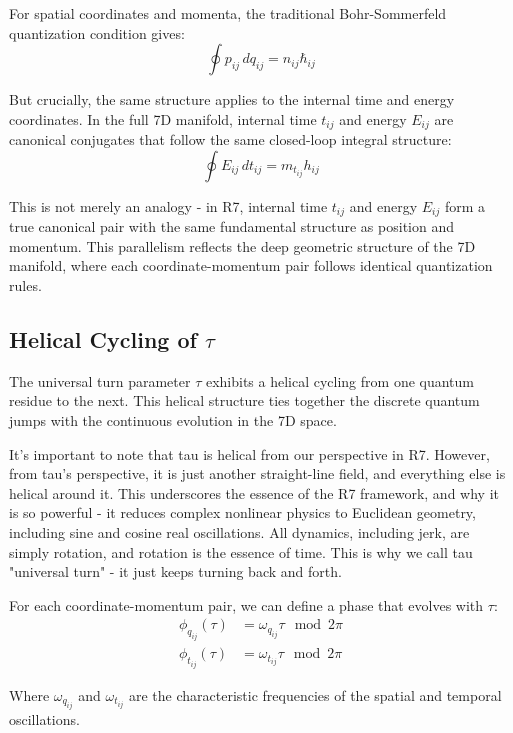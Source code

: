 \documentclass{article}
\begin{document}
For spatial coordinates and momenta, the traditional Bohr-Sommerfeld quantization condition gives:
\begin{equation}
\oint p_{ij} \, dq_{ij} = n_{ij} \hbar_{ij}
\end{equation}

But crucially, the same structure applies to the internal time and energy coordinates. In the full 7D manifold, internal time $t_{ij}$ and energy $E_{ij}$ are canonical conjugates that follow the same closed-loop integral structure:
\begin{equation}
\oint E_{ij} \, dt_{ij} = m_{t_{ij}} h_{ij}
\end{equation}

This is not merely an analogy - in R7, internal time $t_{ij}$ and energy $E_{ij}$ form a true canonical pair with the same fundamental structure as position and momentum. This parallelism reflects the deep geometric structure of the 7D manifold, where each coordinate-momentum pair follows identical quantization rules.

\subsection{Helical Cycling of $\tau$}

The universal turn parameter $\tau$ exhibits a helical cycling from one quantum residue to the next. This helical structure ties together the discrete quantum jumps with the continuous evolution in the 7D space.

It's important to note that tau is helical from our perspective in R7. However, from tau's perspective, it is just another straight-line field, and everything else is helical around it. This underscores the essence of the R7 framework, and why it is so powerful - it reduces complex nonlinear physics to Euclidean geometry, including sine and cosine real oscillations. All dynamics, including jerk, are simply rotation, and rotation is the essence of time. This is why we call tau "universal turn" - it just keeps turning back and forth.

For each coordinate-momentum pair, we can define a phase that evolves with $\tau$:
\begin{align}
\phi_{q_{ij}}(\tau) &= \omega_{q_{ij}} \tau \mod 2\pi \\
\phi_{t_{ij}}(\tau) &= \omega_{t_{ij}} \tau \mod 2\pi
\end{align}

Where $\omega_{q_{ij}}$ and $\omega_{t_{ij}}$ are the characteristic frequencies of the spatial and temporal oscillations.
\end{document}
